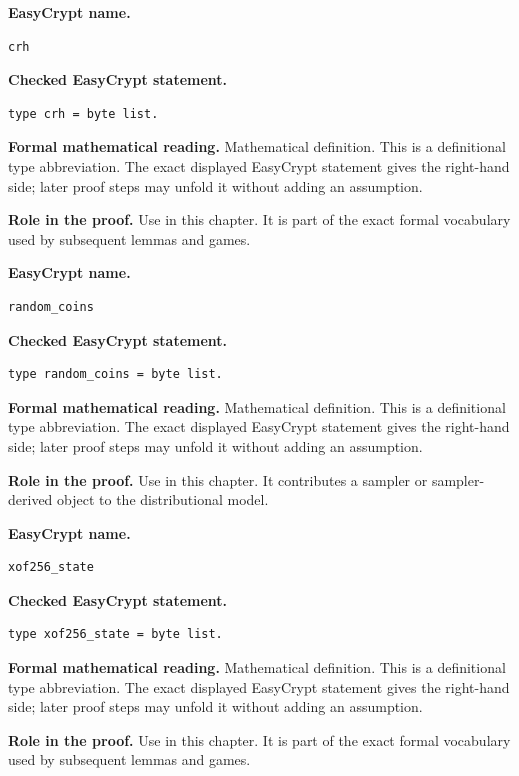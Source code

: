 \begin{formaldefinition}
\noindent\textbf{EasyCrypt name.}
\begin{lstlisting}[language=EasyCrypt,basicstyle=\ttfamily\scriptsize]
crh
\end{lstlisting}
\noindent\textbf{Checked EasyCrypt statement.}
\begin{lstlisting}[language=EasyCrypt,basicstyle=\ttfamily\scriptsize]
type crh = byte list.
\end{lstlisting}
\noindent\textbf{Formal mathematical reading.}
Mathematical definition. This is a definitional type abbreviation.  The exact displayed EasyCrypt statement gives the right-hand side; later proof steps may unfold it without adding an assumption.

\noindent\textbf{Role in the proof.}
Use in this chapter. It is part of the exact formal vocabulary used by subsequent lemmas and games.

\end{formaldefinition}

\begin{formaldefinition}
\noindent\textbf{EasyCrypt name.}
\begin{lstlisting}[language=EasyCrypt,basicstyle=\ttfamily\scriptsize]
random_coins
\end{lstlisting}
\noindent\textbf{Checked EasyCrypt statement.}
\begin{lstlisting}[language=EasyCrypt,basicstyle=\ttfamily\scriptsize]
type random_coins = byte list.
\end{lstlisting}
\noindent\textbf{Formal mathematical reading.}
Mathematical definition. This is a definitional type abbreviation.  The exact displayed EasyCrypt statement gives the right-hand side; later proof steps may unfold it without adding an assumption.

\noindent\textbf{Role in the proof.}
Use in this chapter. It contributes a sampler or sampler-derived object to the distributional model.

\end{formaldefinition}

\begin{formaldefinition}
\noindent\textbf{EasyCrypt name.}
\begin{lstlisting}[language=EasyCrypt,basicstyle=\ttfamily\scriptsize]
xof256_state
\end{lstlisting}
\noindent\textbf{Checked EasyCrypt statement.}
\begin{lstlisting}[language=EasyCrypt,basicstyle=\ttfamily\scriptsize]
type xof256_state = byte list.
\end{lstlisting}
\noindent\textbf{Formal mathematical reading.}
Mathematical definition. This is a definitional type abbreviation.  The exact displayed EasyCrypt statement gives the right-hand side; later proof steps may unfold it without adding an assumption.

\noindent\textbf{Role in the proof.}
Use in this chapter. It is part of the exact formal vocabulary used by subsequent lemmas and games.

\end{formaldefinition}

